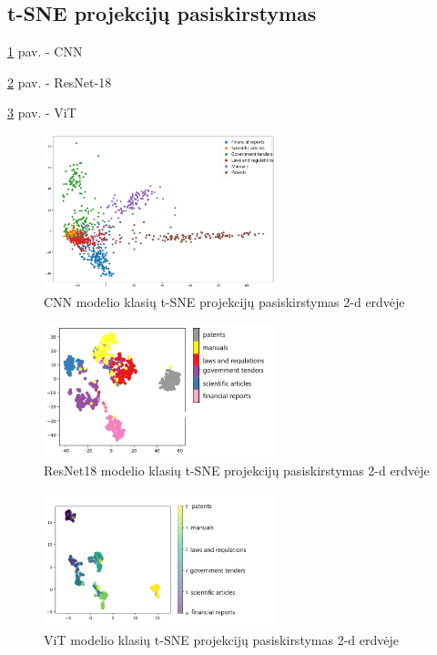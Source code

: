\documentclass[conference]{IEEEtran}
\begin{document}
\subsection{t-SNE projekcijų pasiskirstymas}

\ref{fig4} pav. - CNN 

\ref{fig5} pav. - ResNet-18 

\ref{fig6} pav. - ViT 

\begin{figure}[p]
    \vfill
    \centering
    \includegraphics[width=0.6\textwidth]{cnnT2.png}
    \caption{CNN modelio klasių t-SNE projekcijų pasiskirstymas 2-d erdvėje}
    \label{fig4}
\end{figure}

\begin{figure}[p]
    \vfill
    \centering
    \includegraphics[width=0.6\textwidth]{resnetT1.png}
    \caption{ResNet18 modelio klasių t-SNE projekcijų pasiskirstymas 2-d erdvėje}
    \label{fig5}
\end{figure}

\begin{figure}[p]
    \vfill
    \centering
    \includegraphics[width=0.6\textwidth]{vitT1.png}
    \caption{ViT modelio klasių t-SNE projekcijų pasiskirstymas 2-d erdvėje}
    \label{fig6}
\end{figure}
\end{document}

